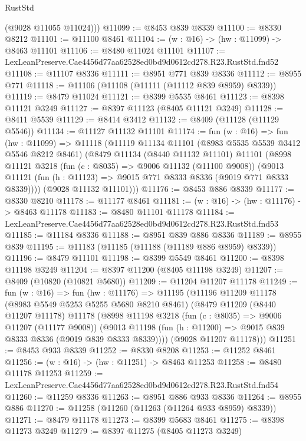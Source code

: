 \begin{lexlean}{RustStd}
\begin{coremodule}
        (@9028 @11055 @11024)))
@11099 := @8453 @839 @8339
@11100 := @8330 @8212
@11101 := @11100 @8461
@11104 := (w : @16) -> (hw : @11099) -> @8463 @11101
@11106 := @8480 @11024 @11101
@11107 := LexLeanPreserve.Cae4456d77aa62528ed0bd9d0612cd278.R23.RustStd.fnd52
@11108 := @11107 @8336
@11111 := @8951 @771 @839 @8336
@11112 := @8955 @771
@11118 := @11106 (@11108 (@11111 (@11112 @839 @8959) @8339))
@11119 := @8479 @11024
@11121 := @8399 @5535 @8461
@11123 := @8398 @11121 @3249
@11127 := @8397 @11123 (@8405 @11121 @3249)
@11128 := @8411 @5539
@11129 := @8414 @3412
@11132 := @8409 (@11128 (@11129 @5546))
@11134 := @11127 @11132 @11101
@11174 := fun (w : @16) =>
  fun (hw : @11099) =>
  @11118
    (@11119
      @11134
      @11101
      (@8983 @5535 @5539 @3412 @5546 @8212 @8461)
      (@8479
        @11134
        (@8440 @11132 @11101)
        @11101
        (@8998
          @11121
          @3218
          (fun (c : @8035) => @9006 @11132 (@11100 @9008))
          (@9013 @11121 (fun (h : @11123) => @9015 @771 @8333 @8336 (@9019 @771 @8333 @8339))))
        (@9028 @11132 @11101)))
@11176 := @8453 @886 @8339
@11177 := @8330 @8210
@11178 := @11177 @8461
@11181 := (w : @16) -> (hw : @11176) -> @8463 @11178
@11183 := @8480 @11101 @11178
@11184 := LexLeanPreserve.Cae4456d77aa62528ed0bd9d0612cd278.R23.RustStd.fnd53
@11185 := @11184 @8336
@11188 := @8951 @839 @886 @8336
@11189 := @8955 @839
@11195 := @11183 (@11185 (@11188 (@11189 @886 @8959) @8339))
@11196 := @8479 @11101
@11198 := @8399 @5549 @8461
@11200 := @8398 @11198 @3249
@11204 := @8397 @11200 (@8405 @11198 @3249)
@11207 := @8409 (@10820 (@10821 @5680))
@11209 := @11204 @11207 @11178
@11249 := fun (w : @16) =>
  fun (hw : @11176) =>
  @11195
    (@11196
      @11209
      @11178
      (@8983 @5549 @5253 @5255 @5680 @8210 @8461)
      (@8479
        @11209
        (@8440 @11207 @11178)
        @11178
        (@8998
          @11198
          @3218
          (fun (c : @8035) => @9006 @11207 (@11177 @9008))
          (@9013 @11198 (fun (h : @11200) => @9015 @839 @8333 @8336 (@9019 @839 @8333 @8339))))
        (@9028 @11207 @11178)))
@11251 := @8453 @933 @8339
@11252 := @8330 @8208
@11253 := @11252 @8461
@11256 := (w : @16) -> (hw : @11251) -> @8463 @11253
@11258 := @8480 @11178 @11253
@11259 := LexLeanPreserve.Cae4456d77aa62528ed0bd9d0612cd278.R23.RustStd.fnd54
@11260 := @11259 @8336
@11263 := @8951 @886 @933 @8336
@11264 := @8955 @886
@11270 := @11258 (@11260 (@11263 (@11264 @933 @8959) @8339))
@11271 := @8479 @11178
@11273 := @8399 @5683 @8461
@11275 := @8398 @11273 @3249
@11279 := @8397 @11275 (@8405 @11273 @3249)

\end{coremodule}
\end{lexlean}

